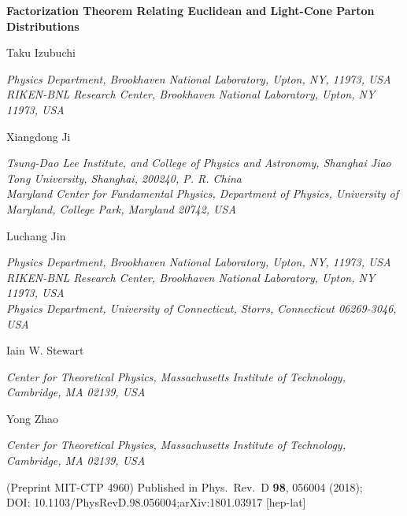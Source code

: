 \documentclass[11pt]{article}
\begin{document}
\begin{center}
	{\LARGE\bfseries Factorization Theorem Relating Euclidean and Light-Cone Parton Distributions\par}
	\vspace{1.6em}
	{\large Taku Izubuchi\par}
	{\small\itshape Physics Department, Brookhaven National Laboratory, Upton, NY, 11973, USA\\
	RIKEN-BNL Research Center, Brookhaven National Laboratory, Upton, NY 11973, USA\par}
	\vspace{0.9em}
	{\large Xiangdong Ji\par}
	{\small\itshape Tsung-Dao Lee Institute, and College of Physics and Astronomy,
	Shanghai Jiao Tong University, Shanghai, 200240, P. R. China\\
	Maryland Center for Fundamental Physics, Department of Physics,
	University of Maryland, College Park, Maryland 20742, USA\par}
	\vspace{0.9em}
	{\large Luchang Jin\par}
	{\small\itshape Physics Department, Brookhaven National Laboratory, Upton, NY, 11973, USA\\
	RIKEN-BNL Research Center, Brookhaven National Laboratory, Upton, NY 11973, USA\\
	Physics Department, University of Connecticut, Storrs, Connecticut 06269-3046, USA\par}
	\vspace{0.9em}
	{\large Iain W. Stewart\par}
	{\small\itshape Center for Theoretical Physics, Massachusetts Institute of Technology, Cambridge, MA 02139, USA\par}
	\vspace{0.9em}
	{\large Yong Zhao\par}
	{\small\itshape Center for Theoretical Physics, Massachusetts Institute of Technology, Cambridge, MA 02139, USA\par}
	\vspace{1.2em}
	{\footnotesize (Preprint MIT-CTP 4960)\quad
	Published in Phys.\ Rev.\ D {\bf 98}, 056004 (2018);\\
	DOI: 10.1103/PhysRevD.98.056004;\quad arXiv:1801.03917 [hep-lat]\par}
\end{center}
\end{document}
